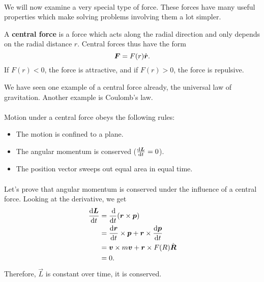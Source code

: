 \documentclass[../classical_mechanics.tex]{subfiles}
\begin{document}
        \paragraph{}
        We will now examine a very special type of force.
        These forces have many useful properties which make solving problems involving them a lot simpler.
        \begin{definition}
            A \textbf{central force} is a force which acts along the radial direction and only depends on the radial distance $r$.
            Central forces thus have the form
            \begin{equation}
                \boldsymbol{F}=F(r)\hat{\boldsymbol{r}}.
            \end{equation}
            If $F(r)<0$, the force is attractive, and if $F(r)>0$, the force is repulsive.
        \end{definition}
        We have seen one example of a central force already, the universal law of gravitation.
        Another example is Coulomb's law.

        \paragraph{}
        Motion under a central force obeys the following rules:
        \begin{itemize}
            \item The motion is confined to a plane.
            \item The angular momentum is conserved ($\dv{\vec{L}}{t}=0$).
            \item The position vector sweeps out equal area in equal time.
        \end{itemize}
        
        \paragraph{}
        Let's prove that angular momentum is conserved under the influence of a central force.
        Looking at the derivative, we get
        \begin{align}
            \dv{\vec{L}}{t}&=\dv{}{t}(\vec{r}\times\vec{p})\\
            &=\dv{\vec{r}}{t}\times\vec{p}+\vec{r}\times\dv{\vec{p}}{t}\\
            &=\vec{v}\times m\vec{v}+\vec{r}\times F(R)\uvec{R}\\
            &=0.
        \end{align}
        Therefore, $\vec{L}$ is constant over time, it is conserved.
\end{document}
